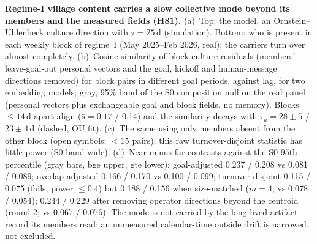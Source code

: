 \caption{\textbf{Regime-I village content carries a slow collective mode beyond its members and the measured fields (H81).}
(a)~Top: the model, an Ornstein--Uhlenbeck culture direction with $\tau=25$\,d (simulation). Bottom: who is present in each weekly block of regime~I (May 2025--Feb 2026, real); the carriers turn over almost completely.
(b)~Cosine similarity of block culture residuals (members' leave-goal-out personal vectors and the goal, kickoff and human-message directions removed) for block pairs in different goal periods, against lag, for two embedding models; gray, 95\% band of the S0 composition null on the real panel (personal vectors plus exchangeable goal and block fields, no memory). Blocks $\le14$\,d apart align ($\bar s=0.17$ / 0.14) and the similarity decays with $\tau_u=28\pm5$ / $23\pm4$\,d (dashed, OU fit).
(c)~The same using only members absent from the other block (open symbols: $<15$ pairs); this raw turnover-disjoint statistic has little power (S0 band wide).
(d)~Near-minus-far contrasts against the S0 95th percentile (gray bars, bge upper, gte lower): goal-adjusted 0.237 / 0.208 vs 0.081 / 0.089; overlap-adjusted 0.166 / 0.170 vs 0.100 / 0.099; turnover-disjoint 0.115 / 0.075 (fails, power $\le0.4$) but 0.188 / 0.156 when size-matched ($m=4$; vs 0.078 / 0.054); 0.244 / 0.229 after removing operator directions beyond the centroid (round 2; vs 0.067 / 0.076). The mode is not carried by the long-lived artifact record its members read; an unmeasured calendar-time outside drift is narrowed, not excluded.}
\label{fig:H81}

